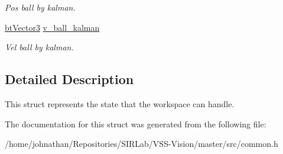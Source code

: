 \begin{DoxyCompactItemize}
\begin{DoxyCompactList}\small\item\em Pos ball by kalman. \end{DoxyCompactList}\item 
\hyperlink{structcommon_1_1btVector3}{bt\+Vector3} \hyperlink{structcommon_1_1State_adc2d51526dffd90f889324c90fa082a0}{v\+\_\+ball\+\_\+kalman}\hypertarget{structcommon_1_1State_adc2d51526dffd90f889324c90fa082a0}{}\label{structcommon_1_1State_adc2d51526dffd90f889324c90fa082a0}

\begin{DoxyCompactList}\small\item\em Vel ball by kalman. \end{DoxyCompactList}\end{DoxyCompactItemize}


\subsection{Detailed Description}
This struct represents the state that the workspace can handle. 

The documentation for this struct was generated from the following file\+:\begin{DoxyCompactItemize}
\item 
/home/johnathan/\+Repositories/\+S\+I\+R\+Lab/\+V\+S\+S-\/\+Vision/master/src/common.\+h\end{DoxyCompactItemize}
